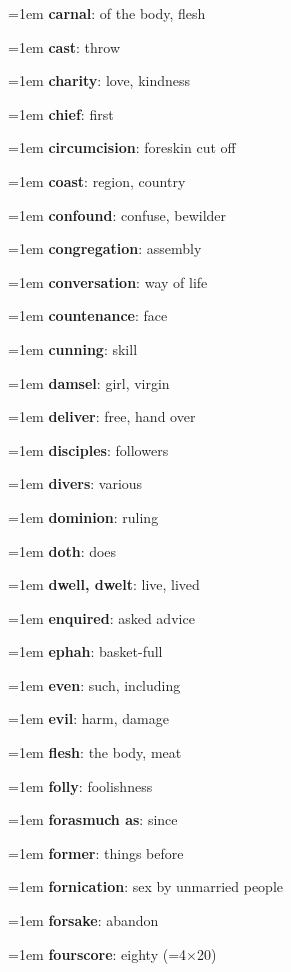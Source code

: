 {\begin{multicols}{3}
{\hangindent=1em \textbf{carnal}: of the body, flesh\par
\hangindent=1em \textbf{cast}: throw\par
\hangindent=1em \textbf{charity}: love, kindness\par
\hangindent=1em \textbf{chief}: first\par
\hangindent=1em \textbf{circumcision}: foreskin cut off\par
\hangindent=1em \textbf{coast}: region, country\par
\hangindent=1em \textbf{confound}: confuse, bewilder\par
\hangindent=1em \textbf{congregation}: assembly\par
\hangindent=1em \textbf{conversation}: way of life\par
\hangindent=1em \textbf{countenance}: face\par
\hangindent=1em \textbf{cunning}: skill\par
\hangindent=1em \textbf{damsel}: girl, virgin\par
\hangindent=1em \textbf{deliver}: free, hand over\par
\hangindent=1em \textbf{disciples}: followers\par
\hangindent=1em \textbf{divers}: various\par
\hangindent=1em \textbf{dominion}: ruling\par
\hangindent=1em \textbf{doth}: does\par
\hangindent=1em \textbf{dwell, dwelt}: live, lived\par
\hangindent=1em \textbf{enquired}: asked advice\par
\hangindent=1em \textbf{ephah}: basket-full\par
\hangindent=1em \textbf{even}: such, including\par
\hangindent=1em \textbf{evil}: harm, damage\par
\hangindent=1em \textbf{flesh}: the body, meat\par
\hangindent=1em \textbf{folly}: foolishness\par
\hangindent=1em \textbf{forasmuch as}: since\par
\hangindent=1em \textbf{former}: things before\par
\hangindent=1em \textbf{fornication}: sex by unmarried people\par
\hangindent=1em \textbf{forsake}: abandon\par
\hangindent=1em \textbf{fourscore}: eighty (=4$\times$20)\par
}
\end{multicols}}
